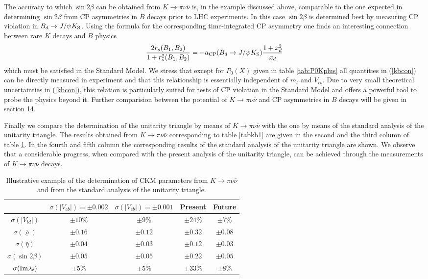 The accuracy to which $\sin 2\beta$ can be obtained from
$K\to\pi\nu\bar\nu$ is, in the  example discussed above, 
comparable to the one expected
in determining $\sin 2\beta$ from CP asymmetries in $B$ decays prior to
LHC experiments.  In this case $\sin 2\beta$ is determined best by
measuring CP violation in $B_d\to J/\psi K_{\rm S}$.
Using the formula  for the corresponding time-integrated 
CP asymmetry one finds an
interesting connection between rare $K$ decays and $B$ physics \cite{BB4}
\begin{equation}\label{kbcon}
{2 r_s(B_1,B_2)\over 1+r^2_s(B_1,B_2)}=
-a_{\mbox{{\scriptsize CP}}}(B_d\to J/\psi K_{\mbox{{\scriptsize S}}})
{1+x^2_d\over x_d}
\end{equation}
which must be satisfied in the Standard Model. We stress that except
for $P_0(X)$ given in table \ref{tab:P0Kplus} all quantities in
(\ref{kbcon}) can be directly measured in experiment and that this
relationship is essentially independent of $m_t$ and $V_{cb}$.
Due to very small theoretical uncertainties in (\ref{kbcon}), this
relation is particularly suited for tests of CP violation in the
Standard Model and offers a powerful tool to probe the physics
beyond it.
Further comparision between the potential of $K \to \pi \nu\bar\nu$ and
CP asymmetries in $B$ decays will be given in section 14.

Finally we  compare the determination of the unitarity triangle by
means of $K\to\pi\nu\bar\nu$ with
the one by means of the standard analysis of the unitarity triangle.
The results obtained from $K\to\pi\nu\bar\nu$ corresponding to table
\ref{tabkb1}
are given in the second and the third column of table 
\ref{tabkb2}. In the fourth and fifth column the corresponding results
of the standard analysis of the unitarity triangle are shown.
We observe that a considerable progress,
when compared with the present analysis of the unitarity triangle,
can be achieved through the measurements of $K\to\pi\nu\bar\nu$
decays.
\begin{table}
\caption[]{Illustrative example of the determination of CKM
parameters from $K\to\pi\nu\bar\nu$ and from the standard
analysis of the unitarity triangle.
\label{tabkb2}}
\vspace{0.4cm}
\begin{center}
\begin{tabular}{|c||c|c||c|c|}\hline
&$\sigma(|V_{cb}|)=\pm 0.002$ & $\sigma(|V_{cb}|)=\pm 0.001$
& {\rm Present} & {\rm Future}
\\ 
\hline
\hline
$\sigma(|V_{td}|) $& $\pm 10\% $ & $ \pm 9\% $
& $\pm 24\%$ & $\pm 7\%$\\ 
\hline 
$\sigma(\bar\varrho) $ & $\pm 0.16$ &$\pm 0.12$
& $\pm 0.32$  & $\pm 0.08$\\
\hline
$\sigma(\bar\eta)$ & $\pm 0.04$&$\pm 0.03$
&$\pm 0.12 $ & $\pm 0.03 $\\
\hline
$\sigma(\sin 2\beta)$ & $\pm 0.05$&$\pm 0.05$
& $\pm 0.22 $ & $\pm 0.05$\\
\hline
$\sigma({\rm Im}\lambda_t)$&$\pm 5\%$ &$\pm 5\%$ 
& $\pm 33\%$ & $\pm 8\%$\\
\hline
\end{tabular}
\end{center}
\end{table}
